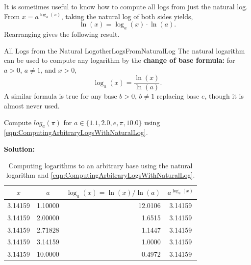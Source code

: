 \bigskip

It is sometimes useful to know how to compute all logs from just the natural log. From $x = a^{\log_a(x)}$, taking the natural log of both sides yields, 
$$\ln(x) = \log_a(x) \cdot \ln(a). $$ 
Rearranging gives the following result. 

\begin{propColor}{All Logs from the Natural Log}{otherLogsFromNaturalLog}
 The natural logarithm can be used to compute any logarithm by the \textbf{change of base formula:} for $a>0$, $a \neq 1$, and $x > 0$,
\begin{equation}
\label{eqn:ComputingArbitraryLogsWithNaturalLog}
    \log_a(x) = \frac{\ln(x)}{\ln(a)}.
\end{equation} 
A similar formula is true for any base $b>0$, $b \neq 1$ replacing base $e$, though it is almost never used. 
\end{propColor}

\begin{example} Compute $log_a(\pi)$ for $a \in \{ 1.1, 2.0, e, \pi, 10.0\}$ using \eqref{eqn:ComputingArbitraryLogsWithNaturalLog}.
    
\end{example}

\textbf{Solution:}

\begin{table}[ht!]
\centering
\begin{tabular}{ccrc}
  \hline
  $x$ & $a$ &$\log_a(x) = \ln(x)/ \ln(a)$ & $a^{\log_a(x)}$ \\ 
  \hline \hline 
  3.14159 & 1.10000 & 12.0106  \hspace*{1cm} & 3.14159\\
  3.14159 & 2.00000 & 1.6515  \hspace*{1cm}& 3.14159\\
  3.14159 & 2.71828 & 1.1447  \hspace*{1cm}& 3.14159\\
  3.14159 & 3.14159 & 1.0000  \hspace*{1cm}& 3.14159\\
  3.14159 & 10.0000 & 0.4972  \hspace*{1cm}& 3.14159\\
  \hline
\end{tabular}
\caption{Computing logarithms to an arbitrary base using the natural logarithm and \eqref{eqn:ComputingArbitraryLogsWithNaturalLog}.}
\end{table}

